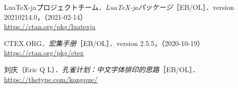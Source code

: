 \documentclass[a4paper , zihao=-4 , fontset=adobe , punct=zh_CN/kaiming]{ctexart}
\begin{document}
\nocite{*}
\begin{thebibliography}{9}
 Lua\TeX-jaプロジェクトチーム．\textit{Lua\TeX-jaパッケージ}［EB/OL］．version 20210214.0，（2021-02-14）\\\mbox{}
\hfill\url{https://ctan.org/pkg/luatexja}

 CTEX.ORG．\textit{\CTeX{}宏集手册}［EB/OL］．version 2.5.5，（2020-10-19）\\\mbox{}
\hfill\url{https://ctan.org/pkg/ctex}

 刘庆（Eric Q L）．\textit{孔雀计划：中文字体排印的思路}［EB/OL］．\\\mbox{}
\hfill\url{https://thetype.com/kongque/}
\end{thebibliography}
\end{document}
